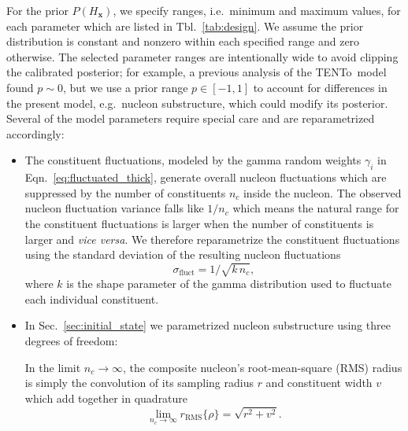 \documentclass[aps,prc,reprint,amsmath,nofootinbib]{revtex4-1}
\newcommand{\trento}{T\raisebox{-0.5ex}{R}ENTo}
\newcommand{\x}{\mathbf{x}}
\begin{document}
For the prior $P(H_\x)$, we specify ranges, i.e.\ minimum and maximum values, for each parameter which are listed in Tbl.~\ref{tab:design}.
We assume the prior distribution is constant and nonzero within each specified range and zero otherwise.
The selected parameter ranges are intentionally wide to avoid clipping the calibrated posterior; for example, a previous analysis of the \trento\ model \cite{Bernhard:2016tnd} found $p \sim 0$, but we use a prior range $p \in [-1, 1]$ to account for differences in the present model, e.g.\ nucleon substructure, which could modify its posterior.
Several of the model parameters require special care and are reparametrized accordingly:
\begin{itemize}[leftmargin=1\parindent]
  \item The constituent fluctuations, modeled by the gamma random weights $\gamma_i$ in Eqn.~\eqref{eq:fluctuated_thick}, generate overall nucleon fluctuations which are suppressed by the number of constituents $n_c$ inside the nucleon.
    The observed nucleon fluctuation variance falls like $1 / n_c$ which means the natural range for the constituent fluctuations is larger when the number of constituents is larger and \emph{vice versa}.
    We therefore reparametrize the constituent fluctuations using the standard deviation of the resulting nucleon fluctuations
    \begin{equation}
      \sigma_\mathrm{fluct} = 1 / \sqrt{k\, n_c},
    \end{equation}
    where $k$ is the shape parameter of the gamma distribution used to fluctuate each individual constituent.
  \item In Sec.~\ref{sec:initial_state} we parametrized nucleon substructure using three degrees of freedom:
    In the limit $n_c \to \infty$, the composite nucleon's root-mean-square (RMS) radius is simply the convolution of its sampling radius $r$ and constituent width $v$ which add together in quadrature
  \begin{equation}
    \lim_{n_c \to\infty} r_\mathrm{RMS}\{\rho\} = \sqrt{r^2 + v^2}.

\end{equation}
\end{itemize}
\end{document}
